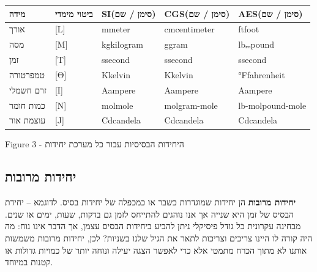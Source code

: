 \documentclass[
  hebrew,
  letterpaper,
  DIV=11,
  numbers=noendperiod]{scrreprt}
\begin{document}
\begin{longtable}[]{@{}
  >{\centering\arraybackslash}p{}
  >{\centering\arraybackslash}p{}
  >{\centering\arraybackslash}p{}
  >{\centering\arraybackslash}p{}
  >{\centering\arraybackslash}p{}@{}}
\toprule\noalign{}
\begin{minipage}[b]{\linewidth}\centering
\textbf{מידה}
\end{minipage} & \begin{minipage}[b]{\linewidth}\centering
\textbf{ביטוי מימדי}
\end{minipage} & \begin{minipage}[b]{\linewidth}\centering
\textbf{SI{(סימן / שם)}}
\end{minipage} & \begin{minipage}[b]{\linewidth}\centering
\textbf{CGS{(סימן / שם)}}
\end{minipage} & \begin{minipage}[b]{\linewidth}\centering
\textbf{AES{(סימן / שם)}}
\end{minipage} \\
\midrule\noalign{}
\endhead
\bottomrule\noalign{}
\endlastfoot
אורך & {[}L{]} & mmeter & cmcentimeter & ftfoot \\
מסה & {[}M{]} & kgkilogram & ggram & lbₘpound \\
זמן & {[}T{]} & ssecond & ssecond & ssecond \\
טמפרטורה & {[}Θ{]} & Kkelvin & Kkelvin & °Ffahrenheit \\
זרם חשמלי & {[}I{]} & Aampere & Aampere & Aampere \\
כמות חומר & {[}N{]} & molmole & molgram-mole & lb-molpound-mole \\
עוצמת אור & {[}J{]} & Cdcandela & Cdcandela & Cdcandela \\
\end{longtable}

Figure {3} - {היחידות הבסיסיות עבור כל מערכת יחידות}

\subsection{\texorpdfstring{{יחידות
מרובות}}{יחידות מרובות}}\label{ux5d9ux5d7ux5d9ux5d3ux5d5ux5ea-ux5deux5e8ux5d5ux5d1ux5d5ux5ea}

{\textbf{יחידות מרובות} הן יחידות שמוגדרות כשבר או כמכפלה של יחידות
בסיס. לדוגמא -- יחידת הבסיס של זמן היא שנייה אך אנו נוהגים להתייחס לזמן
גם בדקות, שעות, ימים או שנים. מבחינה עקרונית כל גודל פיסיקלי ניתן להביע
ביחידות הבסיס עצמן, אך הדבר אינו נוח: מה היה קורה לו היינו צריכים
וצריכות לתאר את הגיל שלנו בשניות?} {לכן, יחידות מרובות משמשות אותנו לא
מתוך הכרח מתמטי אלא כדי לאפשר הצגה יעילה ונוחה יותר של כמויות גדולות או
קטנות במיוחד}.
\end{document}

